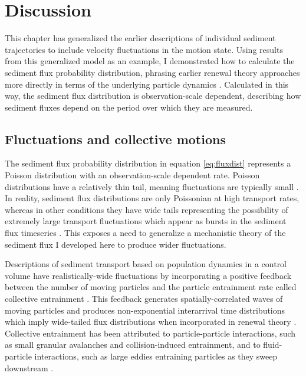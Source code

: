\section{Discussion \label{sec:disc}}

This chapter has generalized the earlier descriptions of individual sediment trajectories \citep[e.g.][]{Lisle1998,Lajeunesse2017} to include velocity fluctuations in the motion state. Using results from this generalized model as an example, I demonstrated how to calculate the sediment flux probability distribution, phrasing earlier renewal theory approaches more directly in terms of the underlying particle dynamics \citep[e.g.][]{Turowski2010,Ancey2020}. 
Calculated in this way, the sediment flux distribution is observation-scale dependent, describing how sediment fluxes depend on the period over which they are measured.

\subsection{Fluctuations and collective motions}

The sediment flux probability distribution in equation \ref{eq:fluxdist} represents a Poisson distribution with an observation-scale dependent rate.
Poisson distributions have a relatively thin tail, meaning fluctuations are typically small \citep{Ancey2006}.
In reality, sediment flux distributions are only Poissonian at high transport rates, whereas in other conditions they have wide tails representing the possibility of extremely large transport fluctuations \citep{Ancey2008,Turowski2010,Dhont2018,Saletti2015} which appear as bursts \citep[e.g.][]{Goh2008} in the sediment flux timeseries \citep{Singh2009, Heyman2013,Benavides2021}. This exposes a need to generalize a mechanistic theory of the sediment flux I developed here to produce wider fluctuations.

Descriptions of sediment transport based on population dynamics in a control volume have realistically-wide fluctuations by incorporating a positive feedback between the number of moving particles and the particle entrainment rate called collective entrainment \citep{Ancey2008,Ancey2014}.
This feedback generates spatially-correlated waves of moving particles \citep{Ancey2014, Heyman2015} and produces non-exponential interarrival time distributions \citep{Heyman2013} which imply wide-tailed flux distributions when incorporated in renewal theory \citep{Turowski2010,Ancey2020}.
Collective entrainment has been attributed to particle-particle interactions, such as small granular avalanches and collision-induced entrainment, and to fluid-particle interactions, such as large eddies entraining particles as they sweep downstream \citep{Heyman2014a,Ancey2014,Lee2018}.

